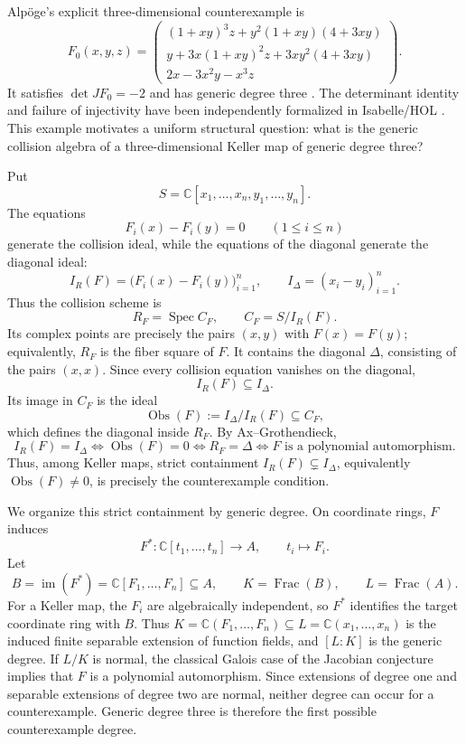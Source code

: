 \documentclass[11pt]{article}
\theoremstyle{remark}
\DeclareMathOperator{\Spec}{Spec}
\DeclareMathOperator{\Frac}{Frac}
\newcommand{\C}{\mathbb C}
\newcommand{\Obs}{\operatorname{Obs}}
\begin{document}
Alpöge's explicit three-dimensional counterexample \cite{Alpoge2026} is
\[
  F_0(x,y,z)=
  \begin{pmatrix}
    (1+xy)^3z+y^2(1+xy)(4+3xy)\\
    y+3x(1+xy)^2z+3xy^2(4+3xy)\\
    2x-3x^2y-x^3z
  \end{pmatrix}.
\]
It satisfies \(\det JF_0=-2\) and has generic degree three
\cite[Theorem~3.3]{Gao2026Counterexamples}.  The determinant identity and
failure of injectivity have been independently formalized in Isabelle/HOL
\cite{AFPJacobianCounterexample}.  This example motivates a
uniform structural question: what is the generic collision algebra of a
three-dimensional Keller map of generic degree three?

Put
\[
  S=\C[x_1,\dots,x_n,y_1,\dots,y_n].
\]
The equations
\[
  F_i(x)-F_i(y)=0\qquad(1\leq i\leq n)
\]
generate the collision ideal, while the equations of the diagonal generate
the diagonal ideal:
\[
  I_R(F)=\bigl(F_i(x)-F_i(y)\bigr)_{i=1}^n,
  \qquad
  I_\Delta=(x_i-y_i)_{i=1}^n.
\]
Thus the collision scheme is
\[
  R_F=\Spec C_F,
  \qquad
  C_F=S/I_R(F).
\]
Its complex points are precisely the pairs \((x,y)\) with \(F(x)=F(y)\);
equivalently, \(R_F\) is the fiber square of \(F\).  It contains the
diagonal \(\Delta\), consisting of the pairs \((x,x)\).  Since every
collision equation vanishes on the diagonal,
\[
  I_R(F)\subseteq I_\Delta.
\]
Its image in \(C_F\) is the ideal
\[
  \Obs(F):=I_\Delta/I_R(F)\subseteq C_F,
\]
which defines the diagonal inside \(R_F\).  By Ax--Grothendieck,
\[
  I_R(F)=I_\Delta
  \Longleftrightarrow
  \Obs(F)=0
  \Longleftrightarrow
  R_F=\Delta
  \Longleftrightarrow
  F\text{ is a polynomial automorphism}.
\]
Thus, among Keller maps, strict containment
\(I_R(F)\subsetneq I_\Delta\), equivalently \(\Obs(F)\neq0\), is precisely
the counterexample condition.

We organize this strict containment by generic degree.  On
coordinate rings, \(F\) induces
\[
  F^*\colon\C[t_1,\dots,t_n]\longrightarrow A,
  \qquad t_i\longmapsto F_i.
\]
Let
\[
  B=\operatorname{im}(F^*)=\C[F_1,\dots,F_n]\subseteq A,
  \qquad K=\Frac(B),
  \qquad L=\Frac(A).
\]
For a Keller map, the \(F_i\) are algebraically independent, so \(F^*\)
identifies the target coordinate ring with \(B\).  Thus
\(K=\C(F_1,\dots,F_n)\subseteq L=\C(x_1,\dots,x_n)\) is the induced
finite separable extension of function fields, and \([L:K]\) is the
generic degree.  If \(L/K\) is normal, the classical Galois case of the
Jacobian conjecture implies that \(F\) is a polynomial automorphism.  Since
extensions of degree one and separable extensions of degree two are normal,
neither degree can occur for a counterexample.  Generic degree three is
therefore the first possible counterexample degree.
\end{document}
